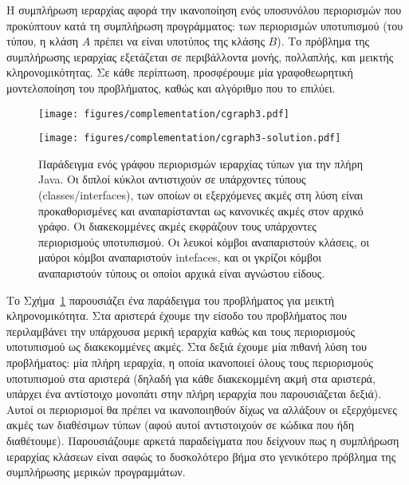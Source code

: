 Η συμπλήρωση ιεραρχίας αφορά την ικανοποίηση ενός υποσυνόλου
περιορισμών που προκύπτουν κατά τη συμπλήρωση προγράμματος: των
περιορισμών υποτυπισμού (του τύπου, η κλάση \(A\) πρέπει να είναι
υποτύπος της κλάσης \(B\)). Το πρόβλημα της συμπλήρωσης ιεραρχίας
εξετάζεται σε περιβάλλοντα μονής, πολλαπλής, και μεικτής
κληρονομικότητας. Σε κάθε περίπτωση, προσφέρουμε μία γραφοθεωρητική
μοντελοποίηση του προβλήματος, καθώς και αλγόριθμο που το επιλύει.

{\en
\begin{figure}[th]
  \renewcommand\figurename{{\gr Σχήμα}}
  \begin{minipage}[b]{.5\linewidth}
    \centering
    \texttt{[image: figures/complementation/cgraph3.pdf]}
    \label{synopsis/fig:real-example:problem}
  \end{minipage}
  \begin{minipage}[b]{.5\linewidth}
    \centering
    \texttt{[image: figures/complementation/cgraph3-solution.pdf]}
    \label{synopsis/fig:real-example:solution}
  \end{minipage}
  \caption[]{{\gr Παράδειγμα ενός γράφου περιορισμών ιεραρχίας τύπων
      για την πλήρη {\en Java}. Οι διπλοί κύκλοι αντιστιχούν σε
      υπάρχοντες τύπους ({\en classes/interfaces}), των οποίων οι
      εξερχόμενες ακμές στη λύση είναι προκαθορισμένες και
      αναπαρίστανται ως κανονικές ακμές στον αρχικό γράφο. Οι
      διακεκομμένες ακμές εκφράζουν τους υπάρχοντες περιορισμούς
      υποτυπισμού. Οι λευκοί κόμβοι αναπαριστούν κλάσεις, οι μαύροι
      κόμβοι αναπαριστούν {\en intefaces}, και οι γκρίζοι κόμβοι
      αναπαριστούν τύπους οι οποίοι αρχικά είναι αγνώστου είδους.}}
  \label{synopsis/fig:real-example}
\end{figure}}

Το Σχήμα~\ref{synopsis/fig:real-example} παρουσιάζει ένα παράδειγμα
του προβλήματος για μεικτή κληρονομικότητα. Στα αριστερά έχουμε την
είσοδο του προβλήματος που περιλαμβάνει την υπάρχουσα μερική ιεραρχία
καθώς και τους περιορισμούς υποτυπισμού ως διακεκομμένες ακμές. Στα
δεξιά έχουμε μία πιθανή λύση του προβλήματος: μία πλήρη ιεραρχία, η
οποία ικανοποιεί όλους τους περιορισμούς υποτυπισμού στα αριστερά
(δηλαδή για κάθε διακεκομμένη ακμή στα αριστερά, υπάρχει ένα
αντίστοιχο μονοπάτι στην πλήρη ιεραρχία που παρουσιάζεται δεξιά).
Αυτοί οι περιορισμοί θα πρέπει να ικανοποιηθούν δίχως να αλλάξουν οι
εξερχόμενες ακμές των διαθέσιμων τύπων (αφού αυτοί αντιστοιχούν σε
κώδικα που ήδη διαθέτουμε). Παρουσιάζουμε αρκετά παραδείγματα που
δείχνουν πως η συμπλήρωση ιεραρχίας κλάσεων είναι σαφώς το δυσκολότερο
βήμα στο γενικότερο πρόβλημα της συμπλήρωσης μερικών προγραμμάτων.

